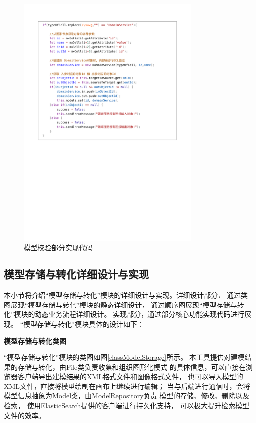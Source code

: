 \begin{figure}[!htbp] %
    \centering %
    \includegraphics[width=0.8\textwidth]{FIGs/chapter4/validation.pdf} %
    \caption{模型校验部分实现代码} %
    \label{validationCode} %
\end{figure}%


\subsection{模型存储与转化详细设计与实现}

本小节将介绍“模型存储与转化”模块的详细设计与实现。详细设计部分，
通过类图展现“模型存储与转化”模块的静态详细设计，
通过顺序图展现“模型存储与转化”模块的动态业务流程详细设计。
实现部分，通过部分核心功能实现代码进行展现。
“模型存储与转化”模块具体的设计如下：

\textbf{模型存储与转化类图}

“模型存储与转化”模块的类图如图\ref{classModelStorage}所示。
本工具提供对建模结果的存储与转化，由File类负责收集和组织图形化模式
的具体信息，可以直接在浏览器客户端导出建模结果的XML格式文件和图像格式文件，
也可以导入模型的XML文件，直接将模型绘制在画布上继续进行编辑；
当与后端进行通信时，会将模型信息抽象为Model类，由ModelRepository负责
模型的存储、修改、删除以及检索，
使用ElasticSearch提供的客户端进行持久化支持，
可以极大提升检索模型文件的效率。

